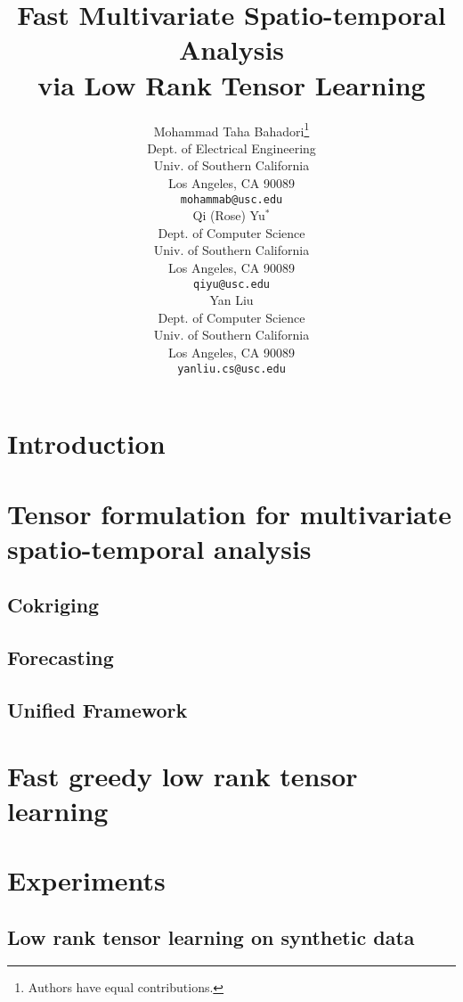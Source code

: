 \documentclass{article} %
\title{Fast Multivariate Spatio-temporal Analysis\\ via Low Rank Tensor Learning}
\author{
Mohammad Taha Bahadori\thanks{ Authors have equal contributions.} \\
Dept. of Electrical Engineering\\
Univ. of Southern California\\
Los Angeles, CA 90089 \\
\texttt{mohammab@usc.edu} \\
\And
Qi (Rose) Yu$^*$ \\
Dept. of Computer Science \\
Univ. of Southern California\\
Los Angeles, CA 90089 \\
\texttt{qiyu@usc.edu} \\
\And
Yan Liu \\
Dept. of Computer Science \\
Univ. of Southern California\\
Los Angeles, CA 90089 \\
\texttt{yanliu.cs@usc.edu} 
}
\begin{document}
\maketitle

\begin{abstract}

\end{abstract}

\section{Introduction}


\vspace{-0.1in}
\section{Tensor formulation for multivariate spatio-temporal analysis}
\vspace{-0.1in}

\subsection{Cokriging}

\subsection{Forecasting}

\subsection{Unified Framework}



\section{Fast greedy low rank tensor learning}



\vspace{-0.1in}
\section{Experiments}
\vspace{-0.1in}
\label{sec:exp}

\subsection{Low rank tensor learning on synthetic data} 

\vspace{-0.1in}
\end{document}
